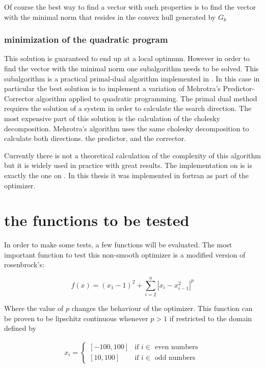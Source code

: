 Of course the best way to find a vector with such properties is to find the vector with the minimal norm that resides in the convex hull generated by $G_k$

\subsection{minimization of the quadratic program}

This solution is guaranteed to end up at a local optimum. However in order to find the vector with the minimal norm one subalgorithm needs to be solved. This subalgorithm is a practical primal-dual algorithm implemented in \citep{skaaja}. In this case in particular the best solution is to implement a variation of Mehrotra's Predictor-Corrector algorithm applied to quadratic programming. The primal dual method requires the solution of a system in order to calculate the search direction. The most expensive part of this solution is the calculation of the cholesky decomposition. Mehrotra's algorithm uses the same cholesky decomposition to calculate both directions. the predictor, and the corrector.

Currently there is not a theoretical calculation of the complexity of this algorithm but it is widely used in practice with great results. The implementation on \citep{skaaja} is is exactly the one on \citep{nocedal}. In this thesis it was implemented in fortran as part of the optimizer.

\chapter{the functions to be tested}

In order to make some tests, a few functions will be evaluated. The most important function to test this non-smooth optimizer is a modified version of rosenbrock's:

\begin{equation}
    f(x) = (x_1 - 1)^2 + \sum_{i = 2}^n |x_i - x_{i - 1}^2|^p
\end{equation}

Where the value of $p$ changes the behaviour of the optimizer. This function can be proven to be lipschitz continuous whenever $p > 1$ if restricted to the domain defined by  

\begin{equation}
  \begin{aligned}
    x_i = 
    \begin{cases}
      [-100, 100] & \text{if } i \in \text{ even numbers} \\
      [10, 100] & \text{if } i \in \text{ odd numbers}
    \end{cases}
  \end{aligned}
\end{equation}

